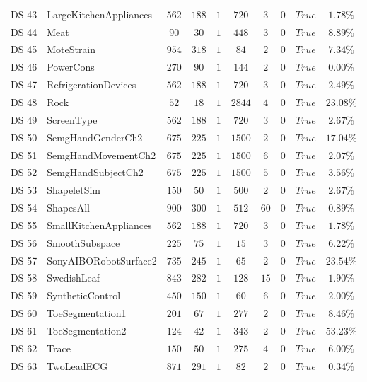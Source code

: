{\begin{longtable}{|ll|cccccccc|}
		DS 43 & LargeKitchenAppliances & $562$ & $188$ & $1$ & $720$ & $3$ & $0$ & $True$ & $1.78\%$ \\
		DS 44 & Meat & $90$ & $30$ & $1$ & $448$ & $3$ & $0$ & $True$ & $8.89\%$ \\
		DS 45 & MoteStrain & $954$ & $318$ & $1$ & $84$ & $2$ & $0$ & $True$ & $7.34\%$ \\
		DS 46 & PowerCons & $270$ & $90$ & $1$ & $144$ & $2$ & $0$ & $True$ & $0.00\%$ \\
		DS 47 & RefrigerationDevices & $562$ & $188$ & $1$ & $720$ & $3$ & $0$ & $True$ & $2.49\%$ \\
		DS 48 & Rock & $52$ & $18$ & $1$ & $2844$ & $4$ & $0$ & $True$ & $23.08\%$ \\
		DS 49 & ScreenType & $562$ & $188$ & $1$ & $720$ & $3$ & $0$ & $True$ & $2.67\%$ \\
		DS 50 & SemgHandGenderCh2 & $675$ & $225$ & $1$ & $1500$ & $2$ & $0$ & $True$ & $17.04\%$ \\
		DS 51 & SemgHandMovementCh2 & $675$ & $225$ & $1$ & $1500$ & $6$ & $0$ & $True$ & $2.07\%$ \\
		DS 52 & SemgHandSubjectCh2 & $675$ & $225$ & $1$ & $1500$ & $5$ & $0$ & $True$ & $3.56\%$ \\
		DS 53 & ShapeletSim & $150$ & $50$ & $1$ & $500$ & $2$ & $0$ & $True$ & $2.67\%$ \\
		DS 54 & ShapesAll & $900$ & $300$ & $1$ & $512$ & $60$ & $0$ & $True$ & $0.89\%$ \\
		DS 55 & SmallKitchenAppliances & $562$ & $188$ & $1$ & $720$ & $3$ & $0$ & $True$ & $1.78\%$ \\
		DS 56 & SmoothSubspace & $225$ & $75$ & $1$ & $15$ & $3$ & $0$ & $True$ & $6.22\%$ \\
		DS 57 & SonyAIBORobotSurface2 & $735$ & $245$ & $1$ & $65$ & $2$ & $0$ & $True$ & $23.54\%$ \\
		DS 58 & SwedishLeaf & $843$ & $282$ & $1$ & $128$ & $15$ & $0$ & $True$ & $1.90\%$ \\
		DS 59 & SyntheticControl & $450$ & $150$ & $1$ & $60$ & $6$ & $0$ & $True$ & $2.00\%$ \\
		DS 60 & ToeSegmentation1 & $201$ & $67$ & $1$ & $277$ & $2$ & $0$ & $True$ & $8.46\%$ \\
		DS 61 & ToeSegmentation2 & $124$ & $42$ & $1$ & $343$ & $2$ & $0$ & $True$ & $53.23\%$ \\
		DS 62 & Trace & $150$ & $50$ & $1$ & $275$ & $4$ & $0$ & $True$ & $6.00\%$ \\
		DS 63 & TwoLeadECG & $871$ & $291$ & $1$ & $82$ & $2$ & $0$ & $True$ & $0.34\%$ \\

\end{longtable}}
